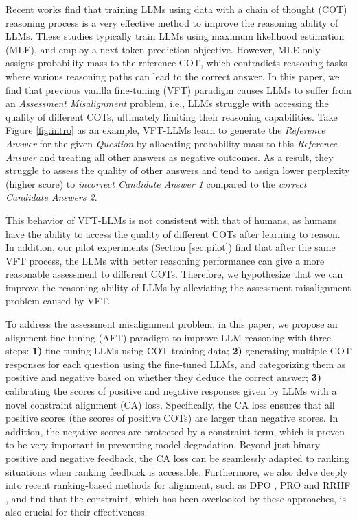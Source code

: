 Recent works \citep{chung2022scaling,hsieh-etal-2023-distilling,mukherjee2023orca} find that training LLMs using data with a chain of thought (COT) reasoning process is a very effective method to improve the reasoning ability of LLMs. These studies typically train LLMs using maximum likelihood estimation (MLE), and employ a next-token prediction objective. However, MLE only assigns probability mass to the reference COT, which contradicts reasoning tasks where various reasoning paths can lead to the correct answer. In this paper, we find that previous vanilla fine-tuning (VFT) paradigm causes LLMs to suffer from an \textit{Assessment Misalignment} problem, i.e., LLMs struggle with accessing the quality of different COTs, ultimately limiting their reasoning capabilities. Take Figure \ref{fig:intro} as an example, VFT-LLMs learn to generate the \textit{Reference Answer} for the given \textit{Question} by allocating probability mass to this \textit{Reference Answer} and treating all other answers as negative outcomes. As a result, they struggle to assess the quality of other answers and tend to assign lower perplexity (higher score) to \textit{incorrect Candidate Answer 1} compared to the \textit{correct Candidate Answers 2}.

This behavior of VFT-LLMs is not consistent with that of humans, as humans have the ability to access the quality of different COTs after learning to reason. In addition, our pilot experiments (Section \ref{sec:pilot}) find that after the same VFT process, the LLMs with better reasoning performance can give a more reasonable assessment to different COTs. Therefore, we hypothesize that we can improve the reasoning ability of LLMs by alleviating the assessment misalignment problem caused by VFT.

To address the assessment misalignment problem, in this paper, we propose an alignment fine-tuning (AFT) paradigm to improve LLM reasoning with three steps:
\textbf{1)} fine-tuning LLMs using COT training data;
\textbf{2)} generating multiple COT responses for each question using the fine-tuned LLMs, and categorizing them as positive and negative based on whether they deduce the correct answer;
\textbf{3)} calibrating the scores of positive and negative responses given by LLMs with a novel constraint alignment (CA) loss. Specifically, the CA loss ensures that all positive scores (the scores of positive COTs) are larger than negative scores. In addition, the negative scores are protected by a constraint term, which is proven to be very important in preventing model degradation. Beyond just binary positive and negative feedback, the CA loss can be seamlessly adapted to ranking situations when ranking feedback is accessible. Furthermore, we also delve deeply into recent ranking-based methods for alignment, such as DPO \citep{dpo}, PRO \citep{song2023preference} and RRHF \citep{yuan2023rrhf}, and find that the constraint, which has been overlooked by these approaches, is also crucial for their effectiveness.

